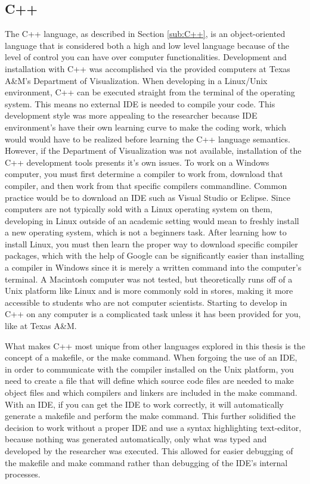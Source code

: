 \subsection{C++}
The C++ language, as described in Section \ref{sub:C++}, is an object-oriented language that is considered both a high and low level language because of the level of control you can have over computer functionalities.  Development and installation with C++ was accomplished via the provided computers at Texas A\&M's Department of Visualization.  When developing in a Linux/Unix environment, C++ can be executed straight from the terminal of the operating system.  This means no external IDE is needed to compile your code.  This development style was more appealing to the researcher because IDE environment's have their own learning curve to make the coding work, which would would have to be realized before learning the C++ language semantics.  However, if the Department of Visualization was not available, installation of the C++ development tools presents it's own issues.  To work on a Windows computer, you must first determine a compiler to work from, download that compiler, and then work from that specific compilers commandline.  Common practice would be to download an IDE such as Visual Studio or Eclipse.  Since computers are not typically sold with a Linux operating system on them, developing in Linux outside of an academic setting would mean to freshly install a new operating system, which is not a beginners task.  After learning how to install Linux, you must then learn the proper way to download specific compiler packages, which with the help of Google can be significantly easier than installing a compiler in Windows since it is merely a written command into the computer's terminal.  A Macintosh computer was not tested, but theoretically runs off of a Unix platform like Linux and is more commonly sold in stores, making it more accessible to students who are not computer scientists.  Starting to develop in C++ on any computer is a complicated task unless it has been provided for you, like at Texas A\&M.

What makes C++ most unique from other languages explored in this thesis is the concept of a makefile, or the make command.  When forgoing the use of an IDE, in order to communicate with the compiler installed on the Unix platform, you need to create a file that will define which source code files are needed to make object files and which compilers and linkers are included in the make command.  With an IDE, if you can get the IDE to work correctly, it will automatically generate a makefile and perform the make command.  This further solidified the decision to work without a proper IDE and use a syntax highlighting text-editor, because nothing was generated automatically, only what was typed and developed by the researcher was executed.  This allowed for easier debugging of the makefile and make command rather than debugging of the IDE's internal processes.

